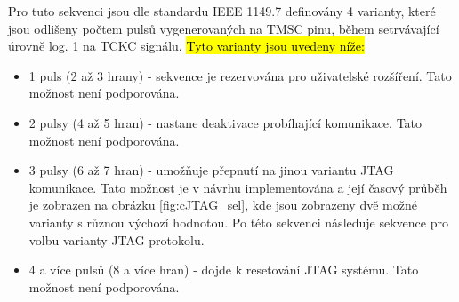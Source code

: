 Pro tuto sekvenci jsou dle standardu IEEE 1149.7 definovány 4 varianty, které jsou odlišeny počtem pulsů vygenerovaných na \acs{TMSC} pinu, během setrvávající úrovně log. 1 na \acs{TCKC} signálu. \hl{Tyto varianty jsou uvedeny níže:}

\begin{itemize}
	\item 1 puls (2 až 3 hrany) - sekvence je rezervována pro uživatelské rozšíření. Tato možnost není podporována.
	\item 2 pulsy (4 až 5 hran) - nastane deaktivace probíhající komunikace. Tato možnost není podporována.
	\item 3 pulsy (6 až 7 hran) - umožňuje přepnutí na jinou variantu \acs{JTAG} komunikace. Tato možnost je v návrhu implementována a její časový průběh je zobrazen na obrázku \ref{fig:cJTAG_sel}, kde jsou zobrazeny dvě možné varianty s různou výchozí hodnotou. Po této sekvenci následuje sekvence pro volbu varianty \acs{JTAG} protokolu.
	\item 4 a více pulsů (8 a více hran) - dojde k resetování \acs{JTAG} systému. Tato možnost není podporována.
\end{itemize}



